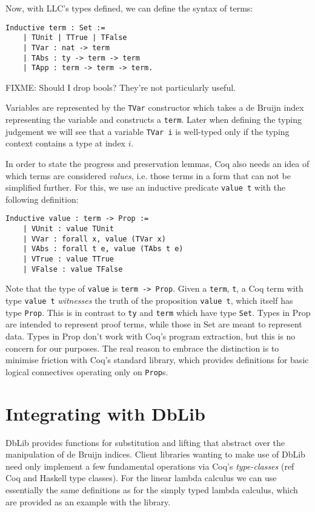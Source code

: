 \documentclass[]{unswthesis}
\let\c\texttt
\let\i\textit
\begin{document}
Now, with LLC's types defined, we can define the syntax of terms:

\begin{verbatim}
Inductive term : Set :=
    | TUnit | TTrue | TFalse
    | TVar : nat -> term
    | TAbs : ty -> term -> term
    | TApp : term -> term -> term.
\end{verbatim}

FIXME: Should I drop bools? They're not particularly useful.

Variables are represented by the \c{TVar} constructor which takes a de Bruijn index representing the variable and constructs a \c{term}. Later when defining the typing judgement we will see that a variable \c{TVar i} is well-typed only if the typing context contains a type at index $i$.

In order to state the progress and preservation lemmas, Coq also needs an idea of which terms are considered \i{values}, i.e. those terms in a form that can not be simplified further. For this, we use an inductive predicate \c{value t} with the following definition:

\begin{verbatim}
Inductive value : term -> Prop :=
    | VUnit : value TUnit
    | VVar : forall x, value (TVar x)
    | VAbs : forall t e, value (TAbs t e)
    | VTrue : value TTrue
    | VFalse : value TFalse
\end{verbatim}

Note that the type of \c{value} is \c{term -> Prop}. Given a \c{term}, \c{t}, a Coq term with type \c{value t} \i{witnesses} the truth of the proposition \c{value t}, which itself has type \c{Prop}. This is in contrast to \c{ty} and \c{term} which have type \c{Set}. Types in Prop are intended to represent proof terms, while those in Set are meant to represent data. Types in Prop don't work with Coq's program extraction, but this is no concern for our purposes. The real reason to embrace the distinction is to minimise friction with Coq's standard library, which provides definitions for basic logical connectives operating only on \c{Prop}s.

\section{Integrating with DbLib}

DbLib provides functions for substitution and lifting that abstract over the manipulation of de Bruijn indices. Client libraries wanting to make use of DbLib need only implement a few fundamental operations via Coq's \i{type-classes} (ref Coq and Haskell type classes). For the linear lambda calculus we can use essentially the same definitions as for the simply typed lambda calculus, which are provided as an example with the library.
\end{document}
